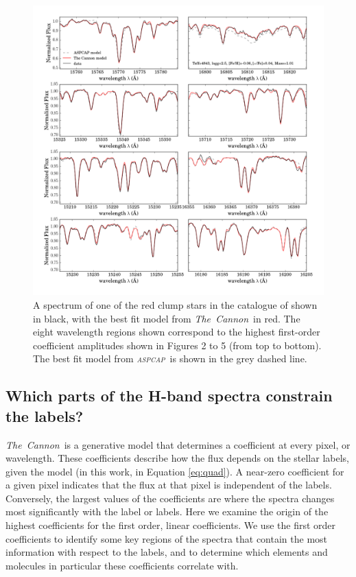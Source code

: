 \documentclass[12pt, preprint]{aastex}
\newcommand{\project}[1]{\textsl{#1}}
\newcommand{\tc}{\project{The~Cannon}}
\newcommand{\aspcap}{\project{\textsc{aspcap}}}
\begin{document}
\begin{figure}[hp]
\centering
      \includegraphics[scale=0.5]{./plots/spectra_fits_7.png}
  \caption{A spectrum of one of the red clump stars in the catalogue of \citet{Bovy2014} shown in black, with the best fit model from \tc\ in red. The eight wavelength regions shown correspond to the highest first-order coefficient amplitudes shown in Figures 2 to 5 (from top to bottom). The best fit model from \aspcap\ is shown in the grey dashed line.}
\label{fig:spectra}
\end{figure}


\subsection{Which parts of the H-band spectra constrain the labels?}


\tc\ is a generative model that determines a coefficient at every pixel, or wavelength. These coefficients describe how the flux depends on the stellar labels, given the model (in this work, in Equation \ref{eq:quad}).   A near-zero coefficient for a given pixel indicates that the flux at that pixel is independent of the labels. Conversely, the largest values of the coefficients are where the spectra changes most significantly with the label or labels. Here we examine the origin of the highest coefficients for the first order, linear coefficients. We use the first order coefficients to identify some key regions of the spectra that contain the most information with respect to the labels, and to determine which elements and molecules in particular these coefficients correlate with. 
\end{document}

